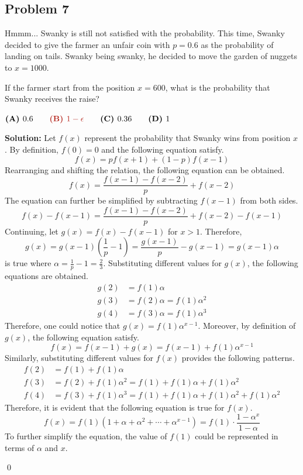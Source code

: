 \documentclass{article}
\newenvironment{solution}
    {\begin{trivlist}\item[]{\bf Solution:}}
    {\qed \end{trivlist}}
\begin{document}
\subsection*{\textcolor{BrickRed}{Problem 7}}
{\color {Gray}
Hmmm... Swanky is still not satisfied with the
probability. This time, Swanky decided to give the
farmer an unfair coin with $p = 0.6$ as the probability
of landing on tails. Swanky being swanky, he decided
to move the garden of nuggets to $x = 1000$.

If the farmer start from the position $x = 600$,
what is the probability that Swanky receives the raise?

$
\textbf{(A) } 0.6 \qquad
\textcolor{BrickRed}{\textbf{(B) } 1 - \epsilon} \qquad
\textbf{(C) } 0.36 \qquad
\textbf{(D) } 1
$
}

\begin{solution}
Let $f(x)$ represent the probability that Swanky
wins from position $x$. By definition, $f(0) = 0$
and the following equation satisfy.
\[
f(x) = p f(x+1) +
    \left( 1 - p \right) f(x-1)
\]
Rearranging and shifting the relation, the following
equation can be obtained.
\[
f(x) = \frac{ f(x-1) - f(x-2) }{p} + f(x-2)
\]
The equation can further be simplified by subtracting
$f(x - 1)$ from both sides.
\[
f(x) - f(x - 1)
= \frac{ f(x-1) - f(x-2) }{p} + f(x - 2) - f(x - 1)
\]
Continuing, let $g(x) = f(x) - f(x - 1)$ for $x > 1$.
Therefore,
\[
g(x)
= g(x - 1) \left( \frac{1}{p} - 1 \right)
= \frac{ g(x - 1) }{p} - g(x - 1)
= g(x - 1) \alpha
\]
is true where $\alpha = \frac{1}{p} - 1 = \frac{2}{3}$.
Substituting different values for $g(x)$, the
following equations are obtained.
\begin{align*}
    g(2) &= f(1) \alpha \\
    g(3) &= f(2) \alpha = f(1) \alpha^2 \\
    g(4) &= f(3) \alpha = f(1) \alpha^3
\end{align*}
Therefore, one could notice that
$g(x) = f(1) \alpha^{x-1}$. Moreover, by definition
of $g(x)$, the following equation satisfy.
\[
f(x)
= f(x - 1) + g(x)
= f(x - 1) + f(1) \alpha^{x-1}
\]
Similarly, substituting different values for $f(x)$
provides the following patterns.
\begin{align*}
    f(2) &= f(1) + f(1) \alpha \\
    f(3) &= f(2) + f(1) \alpha^2
          = f(1) + f(1) \alpha + f(1) \alpha^2 \\
    f(4) &= f(3) + f(1) \alpha^3
          = f(1) + f(1) \alpha + f(1) \alpha^2
                + f(1) \alpha^2
\end{align*}
Therefore, it is evident that the following equation
is true for $f(x)$.
\[
f(x)
= f(1) \left(
    1 + \alpha + \alpha^2 + \cdots + \alpha^{x-1}
\right)
= f(1) \cdot \frac{1 - \alpha^x}{1 - \alpha}
\]
To further simplify the equation, the value of
$f(1)$ could be represented in terms of $\alpha$
and $x$.


\end{solution}
\end{document}
